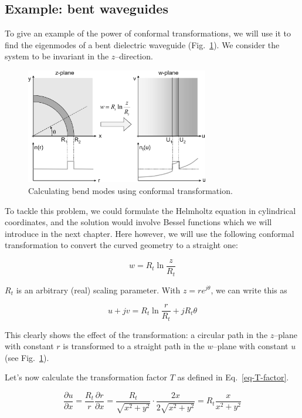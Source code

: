 \begin{sidebar}
\subsection*{Example: bent waveguides}

To give an example of the power of conformal transformations, we will use it to
find the eigenmodes of a bent dielectric waveguide (Fig.~\ref{fig-bends}). We
consider the system to be invariant in the $z$--direction.

\begin{figure}
\centering
\includegraphics[width=8cm, angle=270]{complex/figures/bends}
\caption{Calculating bend modes using conformal transformation.}
\label{fig-bends}
\end{figure}

To tackle this problem, we could formulate the Helmholtz equation in cylindrical
coordinates, and the solution would involve Bessel functions which we will
introduce in the next chapter. Here however, we will use the following conformal
transformation to convert the curved geometry to a straight one:

\begin{equation}
w = R_t \ln \frac{z}{R_t}
\end{equation} 

$R_t$ is an arbitrary (real) scaling parameter. With $z=r e^{j \theta}$, we can
write this as

\begin{equation}
u + jv = R_t \ln \frac{r}{R_t} + j R_t \theta
\end{equation} 

This clearly shows the effect of the transformation: a circular path in the
$z$--plane with constant $r$ is transformed to a straight path in the $w$--plane
with constant $u$ (see Fig.~\ref{fig-bends}).

Let's now calculate the transformation factor $T$ as defined in
Eq.~\ref{eq-T-factor}.

\begin{equation}
\frac{\partial u}{\partial x} = \frac{R_t}{r}\frac{\partial r}{\partial x} = 
\frac{R_t}{\sqrt{x^2+y^2}} \cdot \frac{2x}{2\sqrt{x^2+y^2}} = R_t
\frac{x}{x^2+y^2}
\end{equation} 


\end{sidebar}
